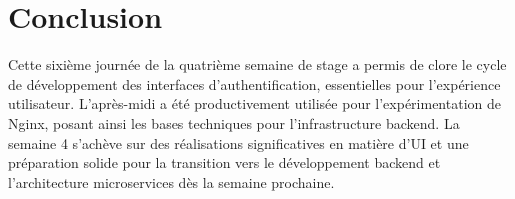 \documentclass[12pt, a4paper]{article}
\begin{document}
\section{Conclusion}
Cette sixième journée de la quatrième semaine de stage a permis de clore le cycle de développement des interfaces d'authentification, essentielles pour l'expérience utilisateur. L'après-midi a été productivement utilisée pour l'expérimentation de Nginx, posant ainsi les bases techniques pour l'infrastructure backend. La semaine 4 s'achève sur des réalisations significatives en matière d'UI et une préparation solide pour la transition vers le développement backend et l'architecture microservices dès la semaine prochaine.
\end{document}
